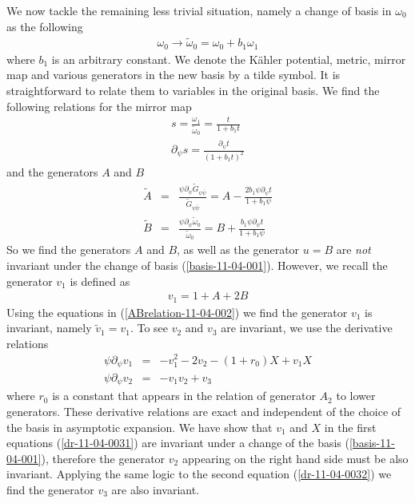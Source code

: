 \documentclass[12pt]{article}
\begin{document}
We now tackle the remaining less trivial situation, namely a
change of basis in $\omega_0$ as the following
\begin{eqnarray} \label{basis-11-04-001}
\omega_0\rightarrow \tilde{\omega}_0=\omega_0+b_1\omega_1
\end{eqnarray}
where $b_1$ is an arbitrary constant. We denote the K\"ahler
potential, metric, mirror map and various generators in the new
basis by a tilde symbol. It is straightforward to relate them to
variables in the original basis. We find the following relations
for the mirror map
\begin{eqnarray}
s=\frac{\omega_1}{\tilde{\omega}_0}=\frac{t}{1+b_1t}
\nonumber \\
\partial_{\psi}s=\frac{\partial_\psi t}{(1+b_1t)^2}
\end{eqnarray}
and the generators $A$ and $B$
\begin{eqnarray} \label{ABrelation-11-04-002}
\tilde{A}&=&\frac{\psi\partial_\psi\tilde{G}_{\psi\bar{\psi}}}{\tilde{G}_{\psi\bar{\psi}}}=A-\frac{2b_1\psi\partial_\psi t}{1+b_1\psi} \nonumber \\
\tilde{B}&=&\frac{\psi\partial_\psi\tilde{\omega}_0}{\tilde{\omega}_0}=B+\frac{b_1\psi\partial_\psi
t}{1+b_1\psi}
\end{eqnarray}
So we find the generators $A$ and $B$, as well as the generator
$u=B$ are \textit{not} invariant under the change of basis
(\ref{basis-11-04-001}). However, we recall the generator $v_1$ is
defined as
\begin{eqnarray}
v_1=1+A+2B
\end{eqnarray}
Using the equations in (\ref{ABrelation-11-04-002}) we find the
generator $v_1$ is invariant, namely $\tilde{v}_1=v_1$. To see
$v_2$ and $v_3$ are invariant, we use the derivative relations
\begin{eqnarray}
\psi\partial_\psi v_1 &=& -v_1^2-2v_2-(1+r_0)X+v_1X \label{dr-11-04-0031} \\
\psi\partial_\psi v_2 &=& -v_1v_2+v_3 \label{dr-11-04-0032}
\end{eqnarray}
where $r_0$ is a constant that appears in the relation of
generator $A_2$ to lower generators. These derivative relations
are exact and independent of the choice of the basis in asymptotic
expansion. We have show that $v_1$ and $X$ in the first equations
(\ref{dr-11-04-0031}) are invariant under a change of the basis
(\ref{basis-11-04-001}), therefore the generator $v_2$ appearing
on the right hand side must be also invariant. Applying the same
logic to the second equation (\ref{dr-11-04-0032}) we find the
generator $v_3$ are also invariant.
\end{document}
